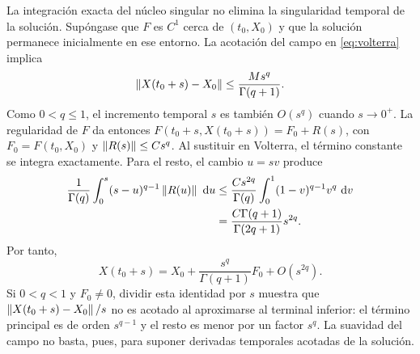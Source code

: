 La integración exacta del núcleo singular no elimina la singularidad temporal
de la solución. Supóngase que \(F\) es \(C^1\) cerca de \((t_0,X_0)\) y que
la solución permanece inicialmente en ese entorno. La acotación del campo en
\cref{eq:volterra} implica
\[
 \left\lVert X(t_0+s)-X_0\right\rVert\leq \frac{M s^q}{\Gamma(q+1)}.
\]
Como \(0<q\leq1\), el incremento temporal \(s\) es también \(O(s^q)\) cuando
\(s\to0^+\). La regularidad de \(F\) da entonces
\(F(t_0+s,X(t_0+s))=F_0+R(s)\), con \(F_0=F(t_0,X_0)\) y
\(\left\lVert R(s)\right\rVert\leq C s^q\). Al sustituir en Volterra, el término constante
se integra exactamente. Para el resto, el cambio \(u=s v\) produce
\[
 \begin{aligned}
 \frac1{\Gamma(q)}\int_0^s(s-u)^{q-1}\left\lVert R(u)\right\rVert\,\,\mathrm d u
 &\leq\frac{C s^{2q}}{\Gamma(q)}
        \int_0^1(1-v)^{q-1}v^q\,\,\mathrm d v\\
 &=\frac{C\Gamma(q+1)}{\Gamma(2q+1)}s^{2q}.
 \end{aligned}
\]
Por tanto,
\begin{equation}
 X(t_0+s)=X_0+\frac{s^q}{\Gamma(q+1)}F_0+O(s^{2q}).
 \label{eq:numerical-startup-expansion}
\end{equation}
Si \(0<q<1\) y \(F_0\ne0\), dividir esta identidad por \(s\) muestra que
\(\left\lVert X(t_0+s)-X_0\right\rVert/s\) no es acotado al aproximarse al terminal inferior:
el término principal es de orden \(s^{q-1}\) y el resto es menor por un
factor \(s^q\). La suavidad del campo no basta, pues, para suponer derivadas
temporales acotadas de la solución.

